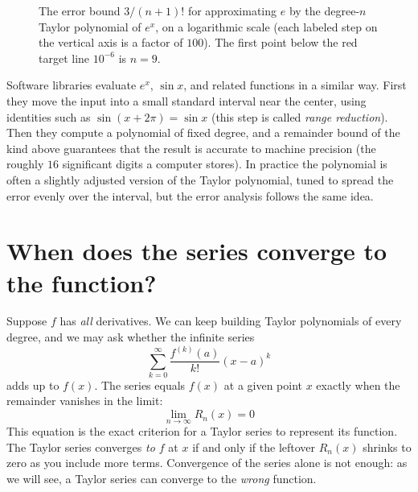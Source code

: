 \begin{figure}[H]
\centering
{}
\caption{The error bound $3/(n+1)!$ for approximating $e$ by the degree-$n$ Taylor
polynomial of $e^x$, on a logarithmic scale (each labeled step on the vertical axis is a factor of $100$).
The first point below the red target line $10^{-6}$ is $n = 9$.}
\label{ch31:fig-e-terms}
\end{figure}

\begin{applicationbox}
Software libraries evaluate $e^x$, $\sin x$, and related functions in a similar way.
First they move the input into a small standard interval near the center, using identities
such as $\sin(x + 2\pi) = \sin x$ (this step is called \emph{range reduction}). Then they
compute a polynomial of fixed degree, and a remainder bound of the kind above guarantees
that the result is accurate to machine precision (the roughly $16$ significant digits a
computer stores). In practice the polynomial is often a slightly adjusted version of the
Taylor polynomial, tuned to spread the error evenly over the interval, but the error
analysis follows the same idea.
\end{applicationbox}

\section{When does the series converge to the function?}

Suppose $f$ has \emph{all} derivatives. We can keep building
Taylor polynomials of every degree, and we may ask whether the infinite series
\[
  \sum_{k=0}^{\infty} \frac{f^{(k)}(a)}{k!}(x-a)^k
\]
adds up to $f(x)$. The series equals $f(x)$ at a given point $x$ exactly when the
remainder vanishes in the limit:
\[
  \boxed{\;\lim_{n\to\infty} R_n(x) = 0\;}
\]
This equation is the exact criterion for a Taylor series to represent its function.
The Taylor series converges \emph{to $f$} at $x$ if and only if the leftover $R_n(x)$ shrinks to
zero as you include more terms. Convergence of the series alone is not enough: as
we will see, a Taylor series can converge to the \emph{wrong} function.

